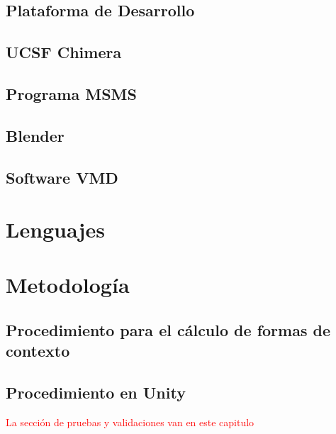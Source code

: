 \subsection{Plataforma de Desarrollo}
\subsection{UCSF Chimera}
\subsection{Programa MSMS}
\subsection{Blender}
\subsection{Software VMD}
\section{Lenguajes}
\section{Metodología}
\subsection{Procedimiento para el cálculo de formas de contexto}
\subsection{Procedimiento en Unity}


\textcolor{red}{La sección de pruebas y validaciones van en este capitulo}